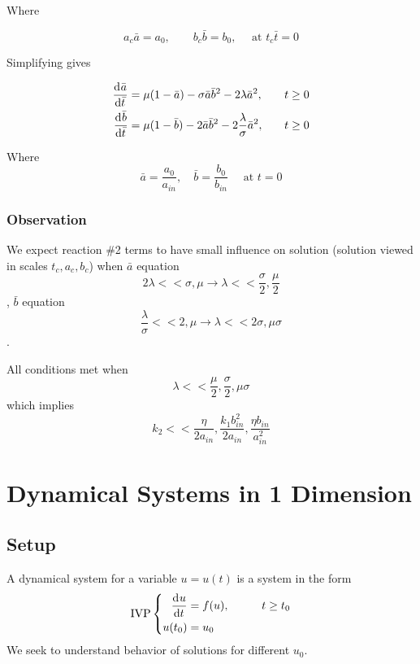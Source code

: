 \documentclass[12pt]{article}
\begin{document}
    Where

    \begin{equation}
      a_c\bar{a} = a_0, \qquad b_c\bar{b} = b_0, \quad\text{ at } t_c\bar{t} = 0
    \end{equation}

    Simplifying gives

    \begin{equation}
      \begin{aligned}
        \frac{\mathrm{d}^{} {\bar{a}}}{\mathrm{d}{\bar{t}}^{}} &= \mu(1-\bar{a}) - \sigma\bar{a}\bar{b}^2 - 2\lambda\bar{a}^2, &\quad t&\ge0 \\
        \frac{\mathrm{d}^{} {\bar{b}}}{\mathrm{d}{\bar{t}}^{}} &= \mu(1-\bar{b}) - 2\bar{a}\bar{b}^2 - 2\frac{\lambda}{\sigma}\bar{a}^2, &\quad t&\ge0 \\
      \end{aligned}
    \end{equation}

    Where
    \begin{equation}
      \bar{a} = \frac{a_0}{a_{in}}, \quad \bar{b} = \frac{b_0}{b_{in}} \quad \text{ at } t=0
    \end{equation}


    \subsubsection{Observation}
    We expect reaction \#2 terms to have small influence on solution (solution
    viewed in scales $t_c, a_c, b_c$) when $\bar{a}$ equation
    $$2\lambda << \sigma, \mu \rightarrow \lambda << \frac{\sigma}{2},\frac{\mu}{2}$$,
    $\bar{b}$ equation $$\frac{\lambda}{\sigma} << 2, \mu \rightarrow \lambda << 2\sigma, \mu\sigma$$.

    All conditions met when
    $$\lambda << \frac{\mu}{2}, \frac{\sigma}{2},\mu\sigma$$ which implies $$k_2 << \frac{\eta}{2a_{in}}, \frac{k_1b_{in}^2}{2a_{in}}, \frac{\eta b_{in}}{a_{in}^2}$$

    \section{Dynamical Systems in 1 Dimension}
    \subsection{Setup}
    A dynamical system for a variable $u=u(t)$ is a system in the form
    \begin{equation} \text{IVP}\left\{
      \begin{aligned}
        \frac{\mathrm{d}^{} {u}}{\mathrm{d}{t}^{}} &= f(u),&\qquad t\ge t_0 \\
        u(t_0) &= u_0 \\
      \end{aligned}\right.
    \end{equation}
    We seek to understand behavior of solutions for different $u_0$.
\end{document}
